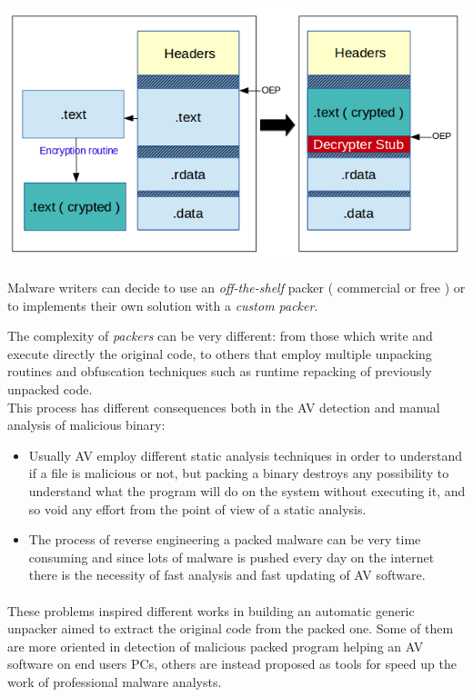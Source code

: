 \includegraphics[width=1.1\textwidth]{pictures/packer_general.png} \\\\

Malware writers can decide to use an \textit{off-the-shelf} packer ( commercial or free ) or to implements their own solution with a \textit{custom packer}.

The complexity of \textit{packers} can be very different: from those which write and execute directly the original code, to others that employ multiple unpacking routines and obfuscation techniques such as runtime repacking of previously unpacked code.\\
This process has different consequences both in the AV detection and manual analysis of malicious binary:
\begin{itemize}
\item Usually AV employ different static analysis techniques in order to understand if a file is malicious or not, but packing a binary destroys any possibility to understand what the program will do on the system without executing it, and so void any effort from the point of view of a static analysis.
\item The process of reverse engineering a packed malware can be very time consuming and since lots of malware is pushed every day on the internet there is the necessity of fast analysis and fast updating of AV software.
\end{itemize}
\paragraph{}
These problems inspired different works in building an automatic generic unpacker aimed to extract the original code from the packed one. Some of them are more oriented in detection of malicious packed program helping an AV software on end users PCs, others are instead proposed as tools for speed up the work of professional malware analysts.
